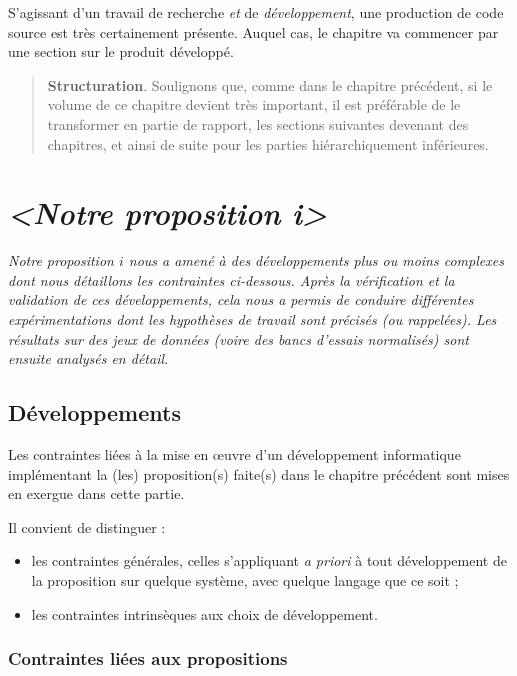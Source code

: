 \documentclass[11pt, french]{report-rd-info}
\newenvironment{structuration}{\begin{quote}\textbf{Structuration}. }{\end{quote}}
\begin{document}
S'agissant d'un travail de recherche \emph{et} de \emph{développement}, une production de code source est très certainement présente. Auquel cas, le chapitre va commencer par une section sur le produit développé.

\begin{structuration}
Soulignons que, comme dans le chapitre précédent, si le volume de ce chapitre devient très important, il est préférable de le transformer en partie de rapport, les sections suivantes devenant des chapitres, et ainsi de suite pour les parties hiérarchiquement inférieures.
\end{structuration}

\section{\emph{<Notre proposition \textit{i}>}}

\emph{Notre proposition $i$ nous a amené à des développements plus ou moins complexes dont nous détaillons les contraintes ci-dessous. Après la vérification et la validation de ces développements, cela nous a permis de conduire différentes expérimentations dont les hypothèses de travail sont précisés (ou rappelées). Les résultats sur des jeux de données (voire des bancs d'essais normalisés) sont ensuite analysés en détail.}

\subsection{Développements}

Les contraintes liées à la mise en \oe uvre d'un développement informatique implémentant la (les) proposition(s) faite(s) dans le chapitre précédent sont mises en exergue dans cette partie.

Il convient de distinguer :
\begin{itemize}
	\item les contraintes générales, celles s'appliquant \emph{a priori} à tout développement de la proposition sur quelque système, avec quelque langage que ce soit ;
	\item les contraintes intrinsèques aux choix de développement.
\end{itemize}

\subsubsection{Contraintes liées aux propositions}
\end{document}
